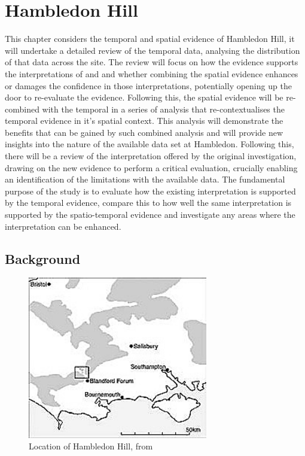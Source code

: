 \chapter{Hambledon Hill} %
\label{ch:hambledon}
This chapter considers the temporal and spatial evidence of Hambledon Hill, it will undertake a detailed review of the temporal data, analysing the distribution of that data across the site. The review will focus on how the evidence supports the interpretations of \citet{Mercer:2008fk} and  \citet{Whittle:2011kl} and whether combining the spatial evidence enhances or damages the confidence in those interpretations, potentially opening up the door to re-evaluate the evidence. Following this, the spatial evidence will be re-combined with the temporal in a series of analysis that re-contextualises the temporal evidence in it's spatial context. This analysis will demonstrate the benefits that can be gained by such combined analysis and will provide new insights into the nature of the available data set at Hambledon. Following this, there will be a review of the interpretation offered by the original investigation, drawing on the new evidence to perform a critical evaluation, crucially enabling an identification of the limitations with the available data. The fundamental purpose of the study is to evaluate how the existing interpretation is supported by the temporal evidence, compare this to how well the same interpretation is supported by the spatio-temporal evidence and investigate any areas where the interpretation can be enhanced.

\section{Background}

\begin{figure}
\begin{center}
	\includegraphics[width=0.7\textwidth]{figures/hambledon-location}
\end{center}
  \caption{Location of Hambledon Hill, from \citep[2]{Mercer:2008fk}}
  \label{fig:location}
\end{figure}

